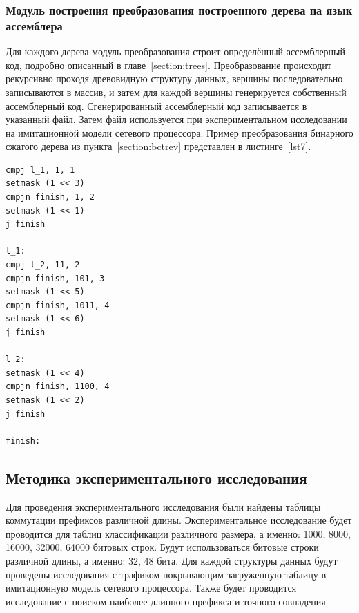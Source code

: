 \documentclass[9pt,a4paper]{article}
\begin{document}
        \subsubsection{Модуль построения преобразования построенного дерева на язык ассемблера}
            Для каждого дерева модуль преобразования строит определённый ассемблерный код, подробно описанный в главе~\ref{section:trees}.
            Преобразование происходит рекурсивно проходя древовидную структуру данных, вершины последовательно записываются в массив, и затем
            для каждой вершины генерируется собственный ассемблерный код.
            Сгенерированный ассемблерный код записывается в указанный файл. Затем файл используется при экспериментальном исследовании на имитационной модели сетевого процессора.
            Пример преобразования бинарного сжатого дерева из пункта~\ref{section:bctrev} представлен в листинге~\ref{lst7}.\\
\begin{lstlisting}[caption=Пример бинарного сжатого дерева на языке ассемблера., label=lst7]
cmpj l_1, 1, 1
setmask (1 << 3)
cmpjn finish, 1, 2
setmask (1 << 1)
j finish

l_1:
cmpj l_2, 11, 2
cmpjn finish, 101, 3
setmask (1 << 5)
cmpjn finish, 1011, 4
setmask (1 << 6)
j finish

l_2:
setmask (1 << 4)
cmpjn finish, 1100, 4
setmask (1 << 2)
j finish

finish:
\end{lstlisting}

    \subsection{Методика экспериментального исследования}
            Для проведения экспериментального исследования были найдены таблицы коммутации префиксов различной длины. Экспериментальное исследование будет проводится
            для таблиц классификации различного размера, а именно: 1000, 8000, 16000, 32000, 64000 битовых строк. Будут использоваться битовые строки различной длины, а именно:
            32, 48 бита. Для каждой структуры данных будут проведены исследования с трафиком покрывающим загруженную таблицу в имитационную модель сетевого процессора.
            Также будет проводится исследование с поиском наиболее длинного префикса и точного совпадения.
            
\end{document}
